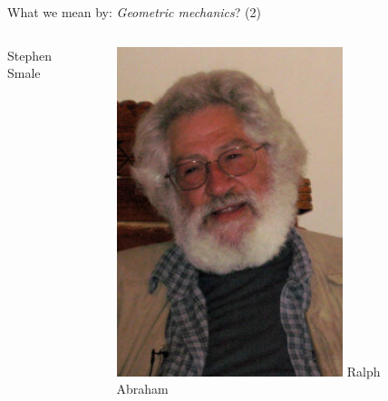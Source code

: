 \documentclass[handout,10pt]{beamer}
\begin{document}
\begin{frame}{What we mean by: \emph{Geometric mechanics}? (2)}
\begin{columns}[T]
\begin{column}{.2\textwidth}
			Stephen \\
			Smale
		\end{column}
		\begin{column}{.2\textwidth}
			\center
			\includegraphics[width=0.8\textwidth]{Pictures/FFat/abraham} 
			Ralph \\			
			Abraham
		\end{column}
		\begin{column}{.2\textwidth}
			\center

\end{column}
\end{columns}
\end{frame}
\end{document}
